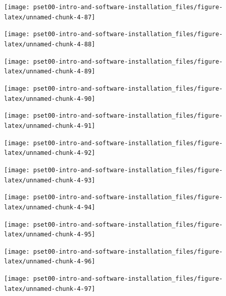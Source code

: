 \documentclass[
]{article}
\begin{document}
\begin{center}\texttt{[image: pset00-intro-and-software-installation\_files/figure-latex/unnamed-chunk-4-87]} \end{center}

\begin{center}\texttt{[image: pset00-intro-and-software-installation\_files/figure-latex/unnamed-chunk-4-88]} \end{center}

\begin{center}\texttt{[image: pset00-intro-and-software-installation\_files/figure-latex/unnamed-chunk-4-89]} \end{center}

\begin{center}\texttt{[image: pset00-intro-and-software-installation\_files/figure-latex/unnamed-chunk-4-90]} \end{center}

\begin{center}\texttt{[image: pset00-intro-and-software-installation\_files/figure-latex/unnamed-chunk-4-91]} \end{center}

\begin{center}\texttt{[image: pset00-intro-and-software-installation\_files/figure-latex/unnamed-chunk-4-92]} \end{center}

\begin{center}\texttt{[image: pset00-intro-and-software-installation\_files/figure-latex/unnamed-chunk-4-93]} \end{center}

\begin{center}\texttt{[image: pset00-intro-and-software-installation\_files/figure-latex/unnamed-chunk-4-94]} \end{center}

\begin{center}\texttt{[image: pset00-intro-and-software-installation\_files/figure-latex/unnamed-chunk-4-95]} \end{center}

\begin{center}\texttt{[image: pset00-intro-and-software-installation\_files/figure-latex/unnamed-chunk-4-96]} \end{center}

\begin{center}\texttt{[image: pset00-intro-and-software-installation\_files/figure-latex/unnamed-chunk-4-97]} \end{center}
\end{document}
